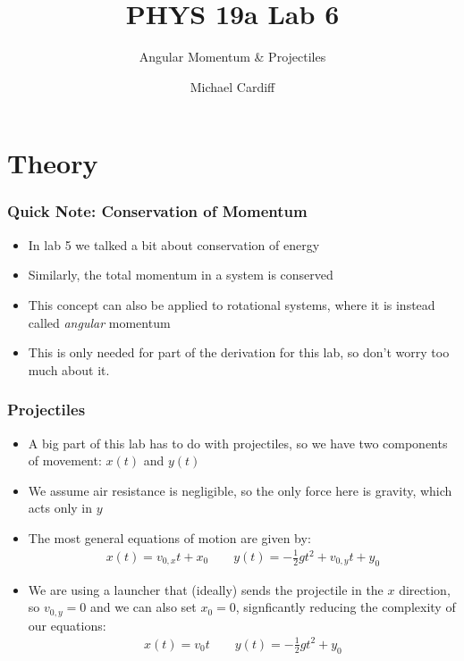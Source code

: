 \documentclass[aspectratio=169]{beamer}
\title{PHYS 19a Lab 6}
\author{Michael Cardiff}
\subtitle{Angular Momentum \& Projectiles}
\begin{document}
\begin{frame}
  \titlepage
\end{frame}

\section{Theory}
\begin{frame}
  \frametitle{Quick Note: Conservation of Momentum}
  \begin{itemize}
  \item In lab 5 we talked a bit about conservation of energy
  \item Similarly, the total momentum in a system is conserved
  \item This concept can also be applied to rotational systems, where it is instead called \emph{angular} momentum
  \item This is only needed for part of the derivation for this lab, so don't worry too much about it.
  \end{itemize}
\end{frame}

\begin{frame}
  \frametitle{Projectiles}
  \begin{itemize}
  \item A big part of this lab has to do with projectiles, so we have two components of movement: $x(t)$ and $y(t)$
  \item We assume air resistance is negligible, so the only force here is gravity, which acts only in $y$
  \item The most general equations of motion are given by:
    \begin{align*}
      x(t)=v_{0,x}t+x_0\qquad y(t)=-\frac12gt^2+v_{0,y}t+y_0
    \end{align*}
  \item We are using a launcher that (ideally) sends the projectile in the $x$ direction, so $v_{0,y}=0$ and we can also set $x_0=0$, signficantly reducing the complexity of our equations:
    \begin{align*}
      \boxed{x(t)=v_{0}t\qquad y(t)=-\frac12gt^2+y_0}
    \end{align*}
  \end{itemize}
\end{frame}
\end{document}
